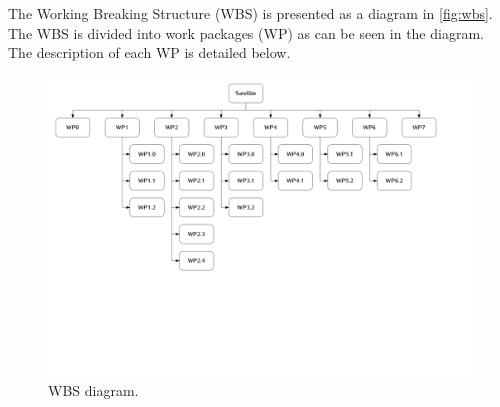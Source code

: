 The Working Breaking Structure (WBS) is presented as a diagram in \autoref{fig:wbs}. The WBS is divided into work packages (WP) as can be seen in the diagram. The description of each WP is detailed below.

\begin{figure}[!ht]
    \begin{center}
        \includegraphics[width=\textwidth]{figures/wbs.pdf}
        \caption{WBS diagram.}
        \label{fig:wbs}
    \end{center}
\end{figure}


